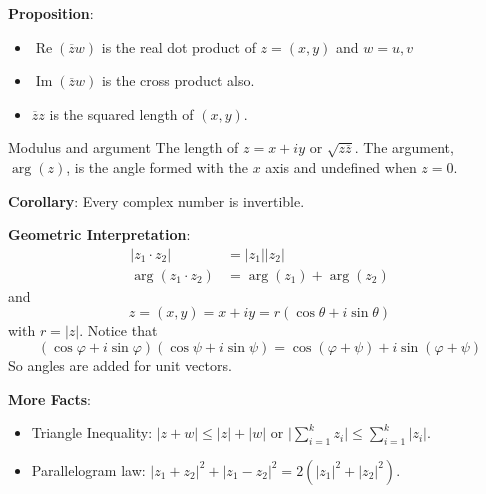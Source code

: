 \documentclass{report}
\begin{document}
\textbf{Proposition}:
    \begin{itemize}
        \item $\mathop{Re}(\overline{z}w)$ is the real dot product of $z = (x, y)$ and $w = u, v$

        \item $\mathop{Im}(\overline{z}w)$ is the cross product also.

        \item $\overline{z}z$ is the squared length of $(x, y)$. 
    \end{itemize}

\begin{definition}{Modulus and argument}
    The length of $z = x + iy$ or $\sqrt{z\overline{z}}$. The argument, $\mathop{arg}(z)$, is the angle formed with the $x$ axis and undefined when $z = 0$. 
\end{definition}

\textbf{Corollary}: Every complex number is invertible.

\textbf{Geometric Interpretation}:
    \begin{align*}
        \lvert z_{1} \cdot z_{2} \rvert &= \lvert z_{1} \rvert \lvert z_{2} \rvert   \\
        \mathop{arg}(z_{1} \cdot z_{2}) &= \mathop{arg}(z_{1}) + \mathop{arg}(z_{2})   
    \end{align*}
and
    \begin{equation*}
        z = (x, y) = x + iy = r(\cos{\theta} + i\sin{\theta})
    \end{equation*} 
with $r = \lvert z \rvert$. Notice that 
    \begin{equation*}
        (\cos{\varphi} + i\sin{\varphi})(\cos{\psi} + i\sin{\psi}) = \cos{(\varphi + \psi)} + i \sin{(\varphi + \psi)}
    \end{equation*}
So angles are added for unit vectors.

\textbf{More Facts}: 
    \begin{itemize}
        \item Triangle Inequality: $\lvert z + w \rvert \leq \lvert z \rvert + \lvert w \rvert$ or $\lvert \sum_{i = 1}^{k}z_{i} \rvert \leq \sum_{i = 1}^{k} \lvert z_{i} \rvert$.

        \item Parallelogram law: $\lvert z_{1} + z_{2} \rvert^{2} + \lvert z_{1} - z_{2} \rvert^{2} = 2(\lvert z_{1} \rvert^{2} + \lvert z_{2} \rvert^{2})$. 
    \end{itemize}
\end{document}
